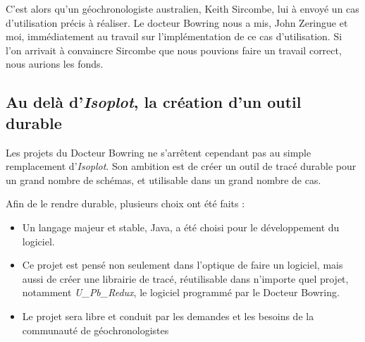 C'est alors qu'un géochronologiste australien, Keith Sircombe, lui à envoyé un cas d'utilisation précis à réaliser. Le docteur Bowring nous a mis, John Zeringue et moi, immédiatement au travail sur l'implémentation de ce cas d'utilisation. Si l'on arrivait à convaincre Sircombe que nous pouvions faire un travail correct, nous aurions les fonds.

\subsection{Au delà d'\textit{Isoplot}, la création d'un outil durable}
Les projets du Docteur Bowring ne s'arrêtent cependant pas au simple remplacement d'\textit{Isoplot}. Son ambition est de créer un outil de tracé durable pour un grand nombre de schémas, et utilisable dans un grand nombre de cas.

Afin de le rendre durable, plusieurs choix ont été faits : 
\begin{itemize}
\item Un langage majeur et stable, Java, a été choisi pour le développement du logiciel.
\item Ce projet est pensé non seulement dans l'optique de faire un logiciel, mais aussi de créer une librairie de tracé, réutilisable dans n'importe quel projet, notamment \textit{U\_Pb\_Redux}, le logiciel programmé par le Docteur Bowring.
\item Le projet sera libre et conduit par les demandes et les besoins de la communauté de géochronologistes
\end{itemize}
